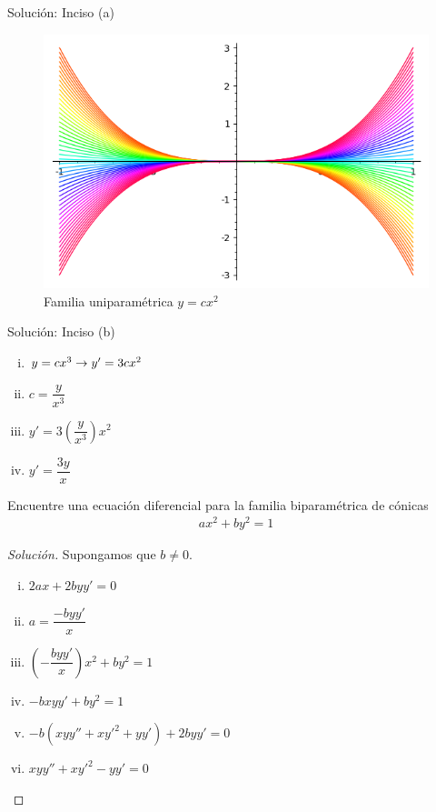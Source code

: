 {Solución: Inciso (a)}
\begin{figure}
	\centering
	\includegraphics[width=\textwidth,keepaspectratio=true]{./edo/solved_problem_02-06.png}
	\caption{Familia uniparamétrica $y=cx^2$}
	\label{fig:solved0206}
\end{figure}



{Solución: Inciso (b)}
\begin{enumerate}[(i)]
	\item  $y=cx^3 \rightarrow y'=3cx^{2}$
	\item $c=\dfrac{y}{x^3}$
	\item $y'=3\left( \dfrac{y}{x^3} \right)x^2$
	\item $y'=\dfrac{3y}{x}$
\end{enumerate}



\begin{resuelto}

	Encuentre una ecuación diferencial para la familia biparamétrica de cónicas
	\begin{align}
		ax^{2}+by^{2}=1
	\end{align}

\end{resuelto}




\begin{proof}[Solución]

	Supongamos que $b\neq 0$.
	\begin{enumerate}[(i)]
		\item $2ax+2byy'=0$
		\item $a = \dfrac{-byy'}{x}$
		\item $\left( -\dfrac{byy'}{x} \right)x^{2}+by^{2}=1$
		\item $-bxyy'+by^{2}=1$
		\item $-b\left( xyy''+xy'^{2}+yy' \right)
		+2byy'=0$
		\item $xyy''+xy'^{2}-yy'=0$
	\end{enumerate}
\end{proof}



